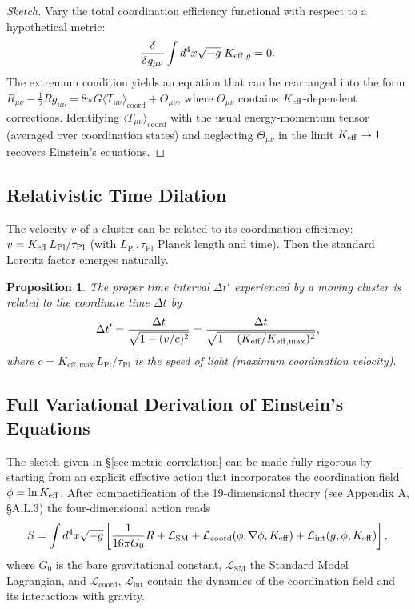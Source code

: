 \documentclass[12pt,a4paper]{article}
\newtheorem{proposition}[theorem]{Proposition}
\newcommand{\Keff}[1][]{K_{\mathrm{eff}\if\relax\detokenize{#1}\relax\else,#1\fi}}   %
\newcommand{\Keffmax}{K_{\mathrm{eff,max}}}
\newcommand{\coord}{\mathrm{coord}}
\newcommand{\Planck}{\mathrm{Pl}}
\begin{document}
	\begin{proof}[Sketch]
		Vary the total coordination efficiency functional with respect to a hypothetical metric:
		\begin{equation}
			\frac{\delta}{\delta g_{\mu\nu}} \int d^4x \sqrt{-g}\; \Keff[g] = 0.
		\end{equation}
		The extremum condition yields an equation that can be rearranged into the form $R_{\mu\nu} - \frac{1}{2}R g_{\mu\nu} = 8\pi G \langle T_{\mu\nu}\rangle_{\coord} + \Theta_{\mu\nu}$, where $\Theta_{\mu\nu}$ contains $\Keff$-dependent corrections. Identifying $\langle T_{\mu\nu}\rangle_{\coord}$ with the usual energy-momentum tensor (averaged over coordination states) and neglecting $\Theta_{\mu\nu}$ in the limit $\Keff\to 1$ recovers Einstein's equations.
	\end{proof}
	
	\subsection{Relativistic Time Dilation}
	
	The velocity $v$ of a cluster can be related to its coordination efficiency: $v = \Keff \, L_{\Planck}/\tau_{\Planck}$ (with $L_{\Planck},\tau_{\Planck}$ Planck length and time). Then the standard Lorentz factor emerges naturally.
	
	\begin{proposition}
		The proper time interval $\Delta t'$ experienced by a moving cluster is related to the coordinate time $\Delta t$ by
		\begin{equation}
			\Delta t' = \frac{\Delta t}{\sqrt{1 - (v/c)^2}} = \frac{\Delta t}{\sqrt{1 - (\Keff/\Keffmax)^2}},
			\label{eq:timedilation}
		\end{equation}
		where $c = \Keffmax \, L_{\Planck}/\tau_{\Planck}$ is the speed of light (maximum coordination velocity).
	\end{proposition}
	
	\subsection{Full Variational Derivation of Einstein's Equations}
	
	The sketch given in \S\ref{sec:metric-correlation} can be made fully rigorous by starting from an explicit effective action that incorporates the coordination field $\phi = \ln \Keff$. After compactification of the 19‑dimensional theory (see Appendix A, \S A.L.3) the four‑dimensional action reads
	\begin{equation}
		S = \int d^4x \sqrt{-g}\left[ \frac{1}{16\pi G_0} R + \mathcal{L}_{\text{SM}} + \mathcal{L}_{\text{coord}}(\phi,\nabla\phi,\Keff) + \mathcal{L}_{\text{int}}(g,\phi,\Keff) \right],
		\label{eq:total-action}
	\end{equation}
	where $G_0$ is the bare gravitational constant, $\mathcal{L}_{\text{SM}}$ the Standard Model Lagrangian, and $\mathcal{L}_{\text{coord}}$, $\mathcal{L}_{\text{int}}$ contain the dynamics of the coordination field and its interactions with gravity.
	
\end{document}
